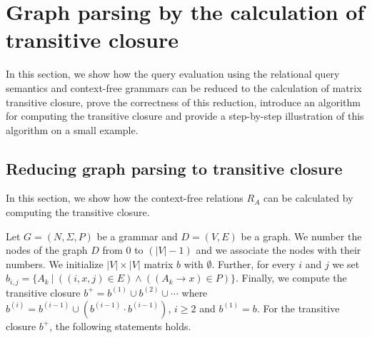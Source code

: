 \section{Graph parsing by the calculation of transitive closure}
In this section, we show how the query evaluation using the relational query semantics and context-free grammars can be reduced to the calculation of matrix transitive closure, prove the correctness of this reduction, introduce an algorithm for computing the transitive closure and provide a step-by-step illustration of this algorithm on a small example.

\subsection{Reducing graph parsing to transitive closure} \label{section_reducing}
In this section, we show how the context-free relations $R_A$ can be calculated by computing the transitive closure.

Let $G = (N,\Sigma,P)$ be a grammar and $D = (V, E)$ be a graph. We number the nodes of the graph $D$ from 0 to $(|V| - 1)$ and we associate the nodes with their numbers. We initialize $|V| \times |V|$ matrix $b$ with $\emptyset$. Further, for every $i$ and $j$ we set $b_{i,j} = \{A_k~|~((i,x,j) \in E) \wedge ((A_k \rightarrow x) \in P)\}$. Finally, we compute the transitive closure $b^+ = b^{(1)} \cup b^{(2)} \cup \cdots$ where $b^{(i)} = b^{(i-1)} \cup (b^{(i-1)} \cdot b^{(i-1)})$, $i \ge 2$ and $b^{(1)} = b$. For the transitive closure $b^+$, the following statements holds.

